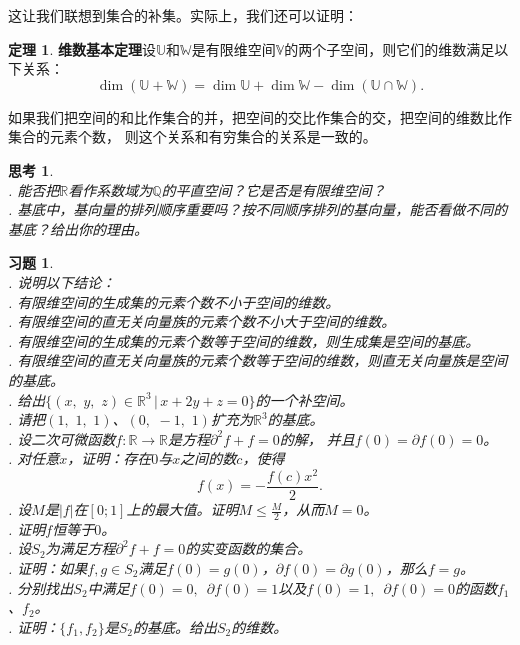 \documentclass[12pt,UTF8]{ctexbook}
\theoremstyle{definition}
\newtheorem{tm}{定理}[section]
\theoremstyle{plain}
\newtheorem{sk}{思考}[section]
\newtheorem{xt}{习题}[section]
\begin{document}
这让我们联想到集合的补集。实际上，我们还可以证明：

\begin{tm}{\textbf{维数基本定理}}\label{tm:4-3-80}
    设$\mathbb{U}$和$\mathbb{W}$是有限维空间$\mathbb{V}$的两个子空间，则它们的维数满足以下关系：
    $$ \dim (\mathbb{U} + \mathbb{W}) = \dim \mathbb{U} + \dim \mathbb{W} - \dim (\mathbb{U} \cap \mathbb{W}).$$
\end{tm}
如果我们把空间的和比作集合的并，把空间的交比作集合的交，把空间的维数比作集合的元素个数，
则这个关系和有穷集合的关系是一致的。

\begin{sk}
    \mbox{} \\
    . 能否把$\mathbb{R}$看作系数域为$\mathbb{Q}$的平直空间？它是否是有限维空间？\\
    . 基底中，基向量的排列顺序重要吗？按不同顺序排列的基向量，能否看做不同的基底？给出你的理由。
\end{sk}

\begin{xt}
    \mbox{} \\
    . 说明以下结论：\\
    . 有限维空间的生成集的元素个数不小于空间的维数。\\
    . 有限维空间的直无关向量族的元素个数不小大于空间的维数。\\
    . 有限维空间的生成集的元素个数等于空间的维数，则生成集是空间的基底。\\
    . 有限维空间的直无关向量族的元素个数等于空间的维数，则直无关向量族是空间的基底。\\
    . 给出$\{(x,\,\,y,\,\,z)\in\mathbb{R}^3 \, | \, x + 2y + z = 0 \}$的一个补空间。\\
    . 请把$(1,\,\,1, \,\,1)$、$(0,\,\, -1, \,\,1)$扩充为$\mathbb{R}^3$的基底。\\
    . 设二次可微函数$f:\mathbb{R} \rightarrow \mathbb{R}$是方程$\partial^2 f + f = 0$的解，
    并且$f(0) = \partial f(0) = 0$。\\
    . 对任意$x$，证明：存在$0$与$x$之间的数$c$，使得
    $$ f(x) = -\frac{f(c)x^2}{2}. $$
    . 设$M$是$|f|$在$[0;1]$上的最大值。证明$M \leqslant \frac{M}{2}$，从而$M = 0$。\\
    . 证明$f$恒等于$0$。\\
    . 设$S_2$为满足方程$\partial^2 f + f = 0$的实变函数的集合。\\
    . 证明：如果$f,g\in S_2$满足$f(0) = g(0)$，$\partial f(0) = \partial g(0)$，那么$f = g$。\\
    . 分别找出$S_2$中满足$f(0) = 0, \,\,\, \partial f(0) = 1$以及$f(0) = 1, \,\,\, \partial f(0) = 0$的函数$f_1$、$f_2$。\\
    . 证明：$\{f_1, f_2\}$是$S_2$的基底。给出$S_2$的维数。
\end{xt}
\end{document}
